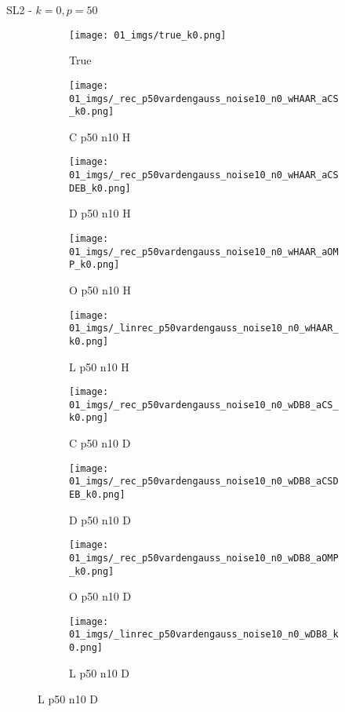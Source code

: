 \begin{frame}{SL2 - $k=0,p=50$}{}
\begin{figure}
\begin{subfigure}{0.1\textwidth}
\texttt{[image: 01\_imgs/true\_k0.png]}
\caption*{\Tiny True}
\end{subfigure}
\begin{subfigure}{0.1\textwidth}
\texttt{[image: 01\_imgs/\_rec\_p50vardengauss\_noise10\_n0\_wHAAR\_aCS\_k0.png]}
\caption*{\Tiny C p50 n10 H}
\end{subfigure}
\begin{subfigure}{0.1\textwidth}
\texttt{[image: 01\_imgs/\_rec\_p50vardengauss\_noise10\_n0\_wHAAR\_aCSDEB\_k0.png]}
\caption*{\Tiny D p50 n10 H}
\end{subfigure}
\begin{subfigure}{0.1\textwidth}
\texttt{[image: 01\_imgs/\_rec\_p50vardengauss\_noise10\_n0\_wHAAR\_aOMP\_k0.png]}
\caption*{\Tiny O p50 n10 H}
\end{subfigure}
\begin{subfigure}{0.1\textwidth}
\texttt{[image: 01\_imgs/\_linrec\_p50vardengauss\_noise10\_n0\_wHAAR\_k0.png]}
\caption*{\Tiny L p50 n10 H}
\end{subfigure}
\begin{subfigure}{0.1\textwidth}
\texttt{[image: 01\_imgs/\_rec\_p50vardengauss\_noise10\_n0\_wDB8\_aCS\_k0.png]}
\caption*{\Tiny C p50 n10 D}
\end{subfigure}
\begin{subfigure}{0.1\textwidth}
\texttt{[image: 01\_imgs/\_rec\_p50vardengauss\_noise10\_n0\_wDB8\_aCSDEB\_k0.png]}
\caption*{\Tiny D p50 n10 D}
\end{subfigure}
\begin{subfigure}{0.1\textwidth}
\texttt{[image: 01\_imgs/\_rec\_p50vardengauss\_noise10\_n0\_wDB8\_aOMP\_k0.png]}
\caption*{\Tiny O p50 n10 D}
\end{subfigure}
\begin{subfigure}{0.1\textwidth}
\texttt{[image: 01\_imgs/\_linrec\_p50vardengauss\_noise10\_n0\_wDB8\_k0.png]}
\caption*{\Tiny L p50 n10 D}
\end{subfigure}

\vspace{5pt}


\end{figure}
\end{frame}
